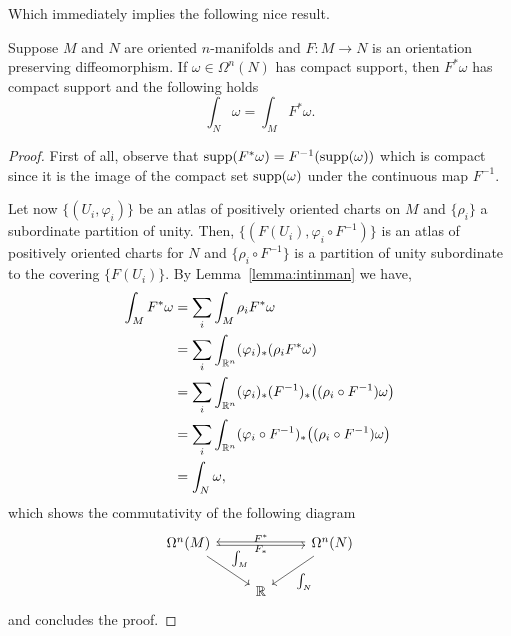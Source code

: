Which immediately implies the following nice result.
\begin{theorem}\label{thm:gcv}
	Suppose $M$ and $N$ are oriented $n$-manifolds and $F:M\to N$ is an orientation preserving diffeomorphism.
	If $\omega\in\Omega^n(N)$ has compact support, then $F^*\omega$ has compact support and the following holds
	\begin{equation}
		\int_N \omega = \int_M F^* \omega.
	\end{equation}
\end{theorem}
\begin{proof}
	First of all, observe that $\operatorname{supp}(F^*\omega) = F^{-1}(\operatorname{supp}(\omega))$ which is compact since it is the image of the compact set $\operatorname{supp}(\omega)$ under the continuous map $F^{-1}$.

	Let now $\{(U_i,\varphi_i)\}$ be an atlas of positively oriented charts on $M$ and $\{\rho_i\}$ a subordinate partition of unity.
	Then, $\{(F(U_i),\varphi_i\circ F^{-1})\}$ is an atlas of positively oriented charts for $N$ and $\{\rho_i \circ F^{-1}\}$ is a partition of unity subordinate to the covering $\{F(U_i)\}$.
	By Lemma~\ref{lemma:intinman} we have,
	\begin{align}
		\int_M F^*\omega & = \sum_i \int_M \rho_i F^*\omega                                           \\
		                 & = \sum_i \int_{\mathbb{R}^n}(\varphi_i)_*(\rho_i F^*\omega)                        \\
		                 & = \sum_i \int_{\mathbb{R}^n}(\varphi_i)_*(F^{-1})_*\big((\rho_i \circ F^{-1}) \omega\big)    \\
		                 & = \sum_i \int_{\mathbb{R}^n}(\varphi_i \circ F^{-1})_*\big((\rho_i \circ F^{-1}) \omega\big) \\
		                 & = \int_N\omega,
	\end{align}
	which shows the commutativity of the following diagram
	\begin{equation}
		\begin{tikzcd}
			\Omega^n(M)
			\arrow[rr, "F^*", above, shift right = 0.5]
			\arrow[dr, "\int_M", below left]
			& & \Omega^n(N)
			\arrow[ll, "F_*", below, shift right = 0.5]
			\arrow[dl, "\int_N"] \\
			& \R &
		\end{tikzcd}
	\end{equation}
	and concludes the proof.
\end{proof}

